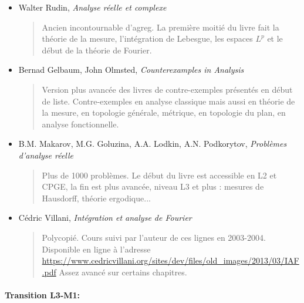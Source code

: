 \documentclass{article}
\begin{document}
\begin{itemize}
\item Walter Rudin, \emph{Analyse réelle et complexe}
\begin{quote}
Ancien incontournable d'agreg. La première moitié du livre fait la théorie de la mesure,  l'intégration de Lebesgue, les espaces $L^p$ et le début de la théorie de Fourier.
\end{quote}
\item Bernad Gelbaum, John Olmsted, \emph{Counterexamples in Analysis}
\begin{quote}
Version plus avancée des livres de contre-exemples présentés en début de liste. Contre-exemples en analyse classique mais aussi en théorie de la mesure, en topologie générale, métrique, en topologie du plan, en analyse fonctionnelle.
\end{quote}
\item B.M. Makarov, M.G. Goluzina, A.A. Lodkin, A.N. Podkorytov, \emph{Problèmes d'analyse réelle}
\begin{quote}
Plus de 1000 problèmes. Le début du livre est accessible en L2 et CPGE, la fin est plus avancée, niveau L3 et plus : mesures de Hausdorff, théorie ergodique...
\end{quote}
\item Cédric Villani, \emph{Intégration et analyse de Fourier}
\begin{quote}
Polycopié. Cours suivi par l'auteur de ces lignes en 2003-2004. Disponible en ligne à l'adresse \url{https://www.cedricvillani.org/sites/dev/files/old_images/2013/03/IAF.pdf} Assez avancé sur certains chapitres.
\end{quote}
\end{itemize}

\paragraph{Transition L3-M1:}
\end{document}
